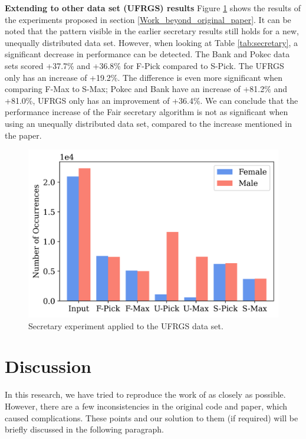 \textbf{Extending to other data set (UFRGS) results}
\label{results_reproducting_original_paper}
\FloatBarrier
Figure \ref{fig:ufrgs_plot} shows the results of the experiments proposed in section \ref{Work_beyond_original_paper}. It can be noted that the pattern visible in the earlier secretary results still holds for a new, unequally distributed data set. However, when looking at Table \ref{tab:secretary}, a significant decrease in performance can be detected. The Bank and Pokec data sets scored +37.7\% and +36.8\% for F-Pick compared to S-Pick. The UFRGS only has an increase of +19.2\%. The difference is even more significant when comparing F-Max to S-Max; Pokec and Bank have an increase of +81.2\% and +81.0\%, UFRGS only has an improvement of +36.4\%. We can conclude that the performance increase of the Fair secretary algorithm is not as significant when using an unequally distributed data set, compared to the increase mentioned in the paper.
\begin{figure}
    \centering
    \includegraphics[width=0.5\linewidth]{media/Images_plots/Secretaryplot_ufrgs__.png}
    \caption{Secretary experiment applied to the UFRGS data set.}
    \label{fig:ufrgs_plot}
\end{figure}

\section{Discussion}

In this research, we have tried to reproduce the work of \citep{correa2021fairness} as closely as possible. However, there are a few inconsistencies in the original code and paper, which caused complications. These points and our solution to them (if required) will be briefly discussed in the following paragraph.

